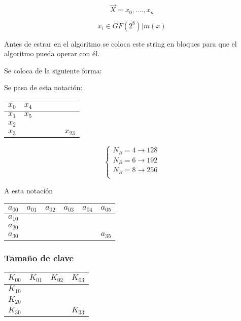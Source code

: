 $$\overrightarrow{X} = x_0 , ...., x_n$$

$$x_i \in GF(2^8)|m(x)$$

Antes de estrar en el algoritmo se coloca este string en bloques para que el algoritmo pueda operar con él.

Se coloca de la siguiente forma:

Se pasa de esta notación:

	\begin{center}
		\begin{tabular}{l | l | c | r | r | r}
			$x_0$ & $x_4$ &  &  &  &  \\
			\hline
			$x_1$  & $x_5$ &  &  &  &  \\
			\hline
			$x_2$  &  &  &  &  &  \\
			\hline
			$x_3$ &  &  &  &  & $x_23$ \\
		\end{tabular}
	\end{center}
	
	$$\begin{cases}
	N_B = 4 \rightarrow 128\\
	N_B = 6 \rightarrow 192\\
	N_B = 8 \rightarrow 256\\
	\end{cases}$$

A esta notación	


	\begin{center}
		
		\begin{tabular}{l | c | r | r | r | r}
			$a_{00}$ & $a_{01}$ & $a_{02}$ & $a_{03}$ & $a_{04}$ & $a_{05}$\\
			\hline
			$a_{10}$ &   &   &   &   &  \\
			\hline
			$a_{20}$ &   &   &   &   &  \\
			\hline
			$a_{30}$ &   &   &   &   & $a_{35}$
			
		\end{tabular}
	\end{center}


\subsubsection{Tamaño de clave}

	\begin{center}
		
		\begin{tabular}{l | c | r | r }
		$K_{00}$ & $K_{01}$ & $K_{02}$ & $K_{03}$\\
		\hline
		$K_{10}$ &  &  & \\
		\hline
		$K_{20}$ &  &  & \\
		\hline
		$K_{30}$ &  &  & $K_{33}$
		
		\end{tabular}
	\end{center}
	
